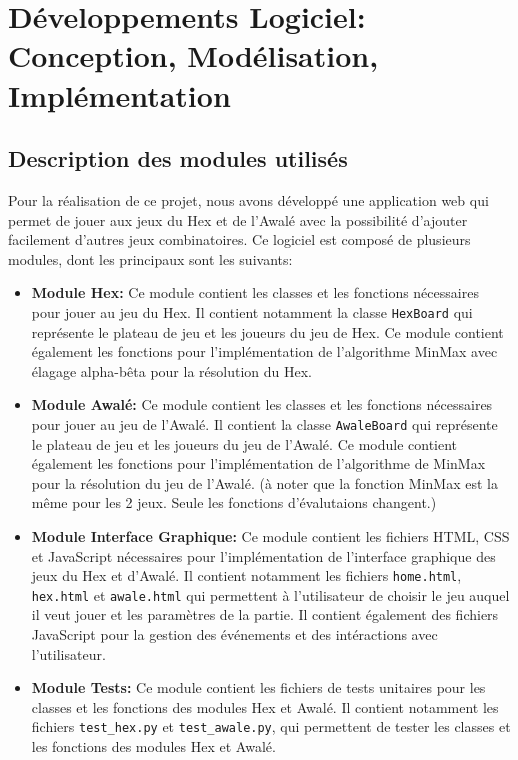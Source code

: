 \section{Développements Logiciel: Conception, Modélisation, Implémentation} 
\subsection{Description des modules utilisés}
Pour la réalisation de ce projet, nous avons développé une application web qui permet de jouer
aux jeux du Hex et de l'Awalé avec la possibilité d'ajouter facilement d'autres jeux combinatoires. Ce logiciel est
composé de plusieurs modules, dont les principaux sont les suivants:

\begin{itemize}
    \item \textbf{Module Hex:} Ce module contient les classes et les fonctions nécessaires
    pour jouer au jeu du Hex. Il contient notamment la classe \texttt{HexBoard} qui 
    représente le plateau de jeu et les joueurs du jeu de Hex. Ce module contient également 
    les fonctions pour l'implémentation de l'algorithme MinMax avec élagage alpha-bêta pour 
    la résolution du Hex.
    
    \item \textbf{Module Awalé:} Ce module contient les classes et les fonctions nécessaires
    pour jouer au jeu de l'Awalé. Il contient la classe \texttt{AwaleBoard} qui représente le
    plateau de jeu et les joueurs du jeu de l'Awalé. Ce module contient également les fonctions
    pour l'implémentation de l'algorithme de MinMax pour la résolution du jeu de l'Awalé. (à noter que la fonction MinMax
    est la même pour les 2 jeux. Seule les fonctions d'évalutaions changent.)
    
    \item \textbf{Module Interface Graphique:} Ce module contient les fichiers HTML, CSS et
    JavaScript nécessaires pour l'implémentation de l'interface graphique des jeux du Hex et
    d'Awalé. Il contient notamment les fichiers \texttt{home.html}, \texttt{hex.html} et
    \texttt{awale.html} qui permettent à l'utilisateur de choisir le jeu auquel il veut jouer
    et les paramètres de la partie. Il contient également des fichiers JavaScript pour la
    gestion des événements et des intéractions avec l'utilisateur.
    
    \item \textbf{Module Tests:} Ce module contient les fichiers de tests unitaires pour les
    classes et les fonctions des modules Hex et Awalé. Il contient notamment les fichiers
    \texttt{test\_hex.py} et \texttt{test\_awale.py}, qui permettent de tester les classes
    et les fonctions des modules Hex et Awalé.
\end{itemize}


